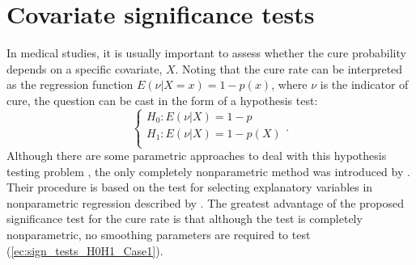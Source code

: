 \section{Covariate significance tests}
\label{sec:covariate_sign_tests}

In medical studies, it is usually important to assess whether the cure probability depends on a specific covariate, $X$. Noting that the cure rate can be interpreted as the regression function $E\left(\nu|X=x \right)=1-p(x)$, where $\nu$ is the indicator of cure, the question can be cast in the form of a hypothesis test:
\begin{equation}
\begin{cases}
 H_0: E\left(\nu|X\right) = 1-p \\
 H_1: E\left(\nu|X\right) = 1-p(X) \\ 
\end{cases}.
\label{ec:sign_tests_H0H1_Case1}
\end{equation}
Although there are some parametric approaches to deal with this hypothesis testing problem \citep[see][among others]{Muller}, the only completely nonparametric method was introduced by \cite{Lopez3}. Their procedure is based on the test for selecting explanatory variables in nonparametric regression described by \cite{Delgado}. The greatest advantage of the proposed significance test for the cure rate is that although the test is completely nonparametric, no smoothing parameters are required to test (\ref{ec:sign_tests_H0H1_Case1}).

